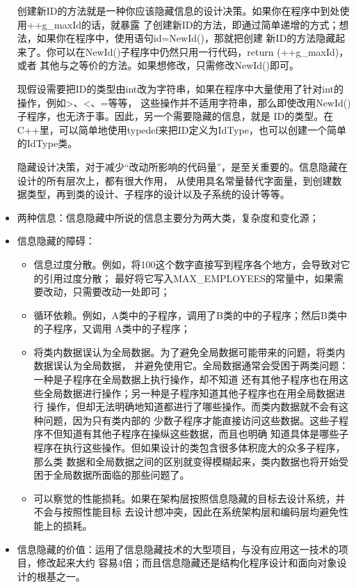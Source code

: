\documentclass{article}
\begin{document}
\begin{itemize}
    \par
    创建新ID的方法就是一种你应该隐藏信息的设计决策。如果你在程序中到处使用++g\_maxId的话，就暴露
    了创建新ID的方法，即通过简单递增的方式；想法，如果你在程序中，使用语句id=NewId()，那就把创建
    新ID的方法隐藏起来了。你可以在NewId()子程序中仍然只用一行代码，return (++g\_maxId)，或者
    其他与之等价的方法。如果想修改，只需修改NewId()即可。
    \par
    现假设需要把ID的类型由int改为字符串，如果在程序中大量使用了针对int的操作，例如>、<、=等等，
    这些操作并不适用字符串，那么即使改用NewId()子程序，也无济于事。因此，另一个需要隐藏的信息，就是
    ID的类型。在C++里，可以简单地使用typedef来把ID定义为IdType，也可以创建一个简单的IdType类。
    \par
    隐藏设计决策，对于减少“改动所影响的代码量”，是至关重要的。信息隐藏在设计的所有层次上，都有很大作用，
    从使用具名常量替代字面量，到创建数据类型，再到类的设计、子程序的设计以及子系统的设计等等。
    \item 两种信息：信息隐藏中所说的信息主要分为两大类，复杂度和变化源；
    \item 信息隐藏的障碍：
    \begin{itemize}
        \item 信息过度分散。例如，将100这个数字直接写到程序各个地方，会导致对它的引用过度分散；
        最好将它写入MAX\_EMPLOYEES的常量中，如果需要改动，只需要改动一处即可；
        \item 循环依赖。例如，A类中的子程序，调用了B类的中的子程序；然后B类中的子程序，又调用
        A类中的子程序；
        \item 将类内数据误认为全局数据。为了避免全局数据可能带来的问题，将类内数据误认为全局数据，
        并避免使用它。全局数据通常会受困于两类问题：一种是子程序在全局数据上执行操作，却不知道
        还有其他子程序也在用这些全局数据进行操作；另一种是子程序知道其他子程序也在用全局数据进行
        操作，但却无法明确地知道都进行了哪些操作。而类内数据就不会有这种问题，因为只有类内部的
        少数子程序才能直接访问这些数据。这些子程序不但知道有其他子程序在操纵这些数据，而且也明确
        知道具体是哪些子程序在执行这些操作。但如果设计的类包含很多体积庞大的众多子程序，那么类
        数据和全局数据之间的区别就变得模糊起来，类内数据也将开始受困于全局数据所面临的那些问题了。
        \item 可以察觉的性能损耗。如果在架构层按照信息隐藏的目标去设计系统，并不会与按照性能目标
        去设计想冲突，因此在系统架构层和编码层均避免性能上的损耗。
    \end{itemize}
    \item 信息隐藏的价值：运用了信息隐藏技术的大型项目，与没有应用这一技术的项目，修改起来大约
    容易4倍；而且信息隐藏还是结构化程序设计和面向对象设计的根基之一。
\end{itemize}
\end{document}
